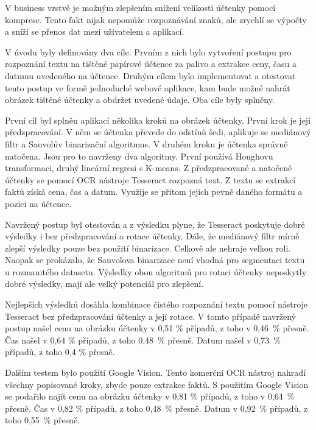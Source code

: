 \documentclass[thesis=B,czech]{FITthesis}[2019/12/23]
\begin{document}
V business vrstvě je možným zlepšením snížení velikosti účtenky pomocí komprese. Tento fakt nijak nepomůže rozpoznávání znaků, ale zrychlí se výpočty a sníží se přenos dat mezi uživatelem a aplikací.


\begin{conclusion}

	V úvodu byly definovány dva cíle. Prvním z nich bylo vytvoření postupu pro rozpoznání textu na tištěné papírové účtence za palivo a extrakce ceny, času a datumu uvedeného na účtence. Druhým cílem bylo implementovat a otestovat tento postup ve formě jednoduché webové aplikace, kam bude možné nahrát obrázek tištěné účtenky a obdržet uvedené údaje. Oba cíle byly splněny.

	První cíl byl splněn aplikací několika kroků na obrázek účtenky. První krok je její předzpracování. V něm se účtenka převede do odstínů šedi, aplikuje se mediánový filtr a Sauvolův binarizační algoritmus. V druhém kroku je účtenka správně natočena. Jsou pro to navrženy dva algoritmy. První používá Houghovu transformaci, druhý lineární regresi s K-means. Z předzpracované a natočené účtenky se pomocí OCR nástroje Tesseract rozpozná text. Z textu se extrakcí faktů získá cena, čas a datum. Využije se přitom jejich pevně daného formátu a pozici na účtence.

    Navržený postup byl otestován a z výsledku plyne, že Tesseract poskytuje dobré výsledky i bez předzpracování a rotace účtenky. Dále, že mediánový filtr mírně zlepší výsledky pouze bez použití binarizace. Celkově ale nehraje velkou roli. Naopak se prokázalo, že Sauvolova binarizace není vhodná pro segmentaci textu u rozmanitého datasetu. Výsledky obou algoritmů pro rotaci účtenky neposkytly dobré výsledky, mají ale velký potenciál pro zlepšení.

    Nejlepších výsledků dosáhla kombinace čistého rozpoznání textu pomocí nástroje Tesseract bez předzpracování účtenky a její rotace. V tomto případě navržený postup našel cenu na obrázku účtenky v 0,51 \% případů, z toho v 0,46~\% přesně. Čas našel v 0,64 \% případů, z toho 0,48~\% přesně. Datum našel v 0,73~\% případů, z toho 0,4 \% přesně.

    Dalším testem bylo použití Google Vision. Tento komerční OCR nástroj nahradí všechny popisované kroky, zbyde pouze extrakce faktů. S použitím Google Vision se podařilo najít cenu na obrázku účtenky v 0,81 \% případů, z toho v 0,64~\% přesně. Čas v 0,82 \% případů, z toho 0,48~\% přesně. Datum v 0,92~\% případů, z toho 0,55~\% přesně.


\end{conclusion}
\end{document}
